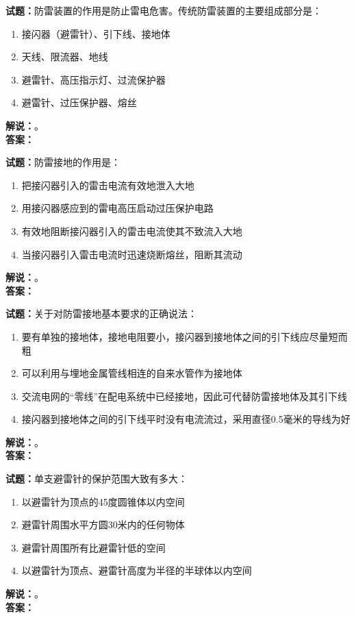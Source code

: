 \documentclass{ctexbook}
\begin{document}
\bigskip

\noindent\textbf{试题：}防雷装置的作用是防止雷电危害。传统防雷装置的主要组成部分是：
\begin{enumerate}[leftmargin=3em]
  \item 接闪器（避雷针）、引下线、接地体
  \item 天线、限流器、地线
  \item 避雷针、高压指示灯、过流保护器
  \item 避雷针、过压保护器、熔丝
\end{enumerate}
\noindent\textbf{解说：}\textbf{}。\\\noindent\textbf{答案：}

\bigskip

\noindent\textbf{试题：}防雷接地的作用是：
\begin{enumerate}[leftmargin=3em]
  \item 把接闪器引入的雷击电流有效地泄入大地
  \item 用接闪器感应到的雷电高压启动过压保护电路
  \item 有效地阻断接闪器引入的雷击电流使其不致流入大地
  \item 当接闪器引入雷击电流时迅速烧断熔丝，阻断其流动
\end{enumerate}
\noindent\textbf{解说：}\textbf{}。\\\noindent\textbf{答案：}

\bigskip

\noindent\textbf{试题：}关于对防雷接地基本要求的正确说法：
\begin{enumerate}[leftmargin=3em]
  \item 要有单独的接地体，接地电阻要小，接闪器到接地体之间的引下线应尽量短而粗
  \item 可以利用与埋地金属管线相连的自来水管作为接地体
  \item 交流电网的“零线”在配电系统中已经接地，因此可代替防雷接地体及其引下线
  \item 接闪器到接地体之间的引下线平时没有电流流过，采用直径0.5毫米的导线为好
\end{enumerate}
\noindent\textbf{解说：}\textbf{}。\\\noindent\textbf{答案：}

\bigskip

\noindent\textbf{试题：}单支避雷针的保护范围大致有多大：
\begin{enumerate}[leftmargin=3em]
  \item 以避雷针为顶点的45度圆锥体以内空间
  \item 避雷针周围水平方圆30米内的任何物体
  \item 避雷针周围所有比避雷针低的空间
  \item 以避雷针为顶点、避雷针高度为半径的半球体以内空间
\end{enumerate}
\noindent\textbf{解说：}\textbf{}。\\\noindent\textbf{答案：}
\end{document}
